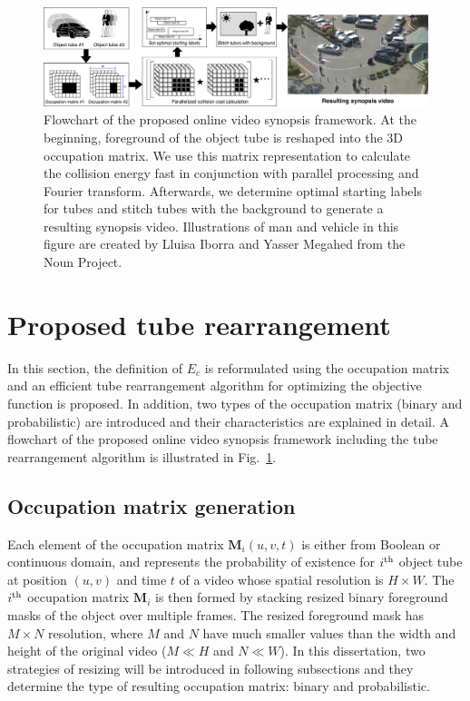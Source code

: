 \documentclass[11pt]{hyu_thesis}
\begin{document}
\begin{figure}
\includegraphics[width=\linewidth]{flowchart.pdf}
\caption{Flowchart of the proposed online video synopsis framework. At the beginning, foreground of the object tube is reshaped into the 3D occupation matrix. We use this matrix representation to calculate the collision energy fast in conjunction with parallel processing and Fourier transform. Afterwards, we determine optimal starting labels for tubes and stitch tubes with the background to generate a resulting synopsis video. Illustrations of man and vehicle in this figure are created by Lluisa Iborra and Yasser Megahed from the Noun Project.}
\label{fig:flowchart}
\end{figure}

\section{Proposed tube rearrangement}
\label{sec:proposed}
In this section, the definition of $E_c$ is reformulated using the occupation matrix and an efficient tube rearrangement algorithm for optimizing the objective function is proposed. In addition, two types of the occupation matrix (binary and probabilistic) are introduced and their characteristics are explained in detail. A flowchart of the proposed online video synopsis framework including the tube rearrangement algorithm is illustrated in Fig.~\ref{fig:flowchart}.

\subsection{Occupation matrix generation}
\label{sec:proposed:occ}
Each element of the occupation matrix $\textbf{M}_i (u,v,t)$ is either from Boolean or continuous domain, and represents the probability of existence for $i^{\rm{th}}$ object tube at position $(u,v)$ and time $t$ of a video whose spatial resolution is $H \times W$. The $i^{\rm{th}}$ occupation matrix $\textbf{M}_i$ is then formed by stacking resized binary foreground masks of the object over multiple frames. The resized foreground mask has $M \times N$ resolution, where $M$ and $N$ have much smaller values than the width and height of the original video ($M \ll H$ and $N \ll W$). In this dissertation, two strategies of resizing will be introduced in following subsections and they determine the type of resulting occupation matrix: binary and probabilistic.
\end{document}
